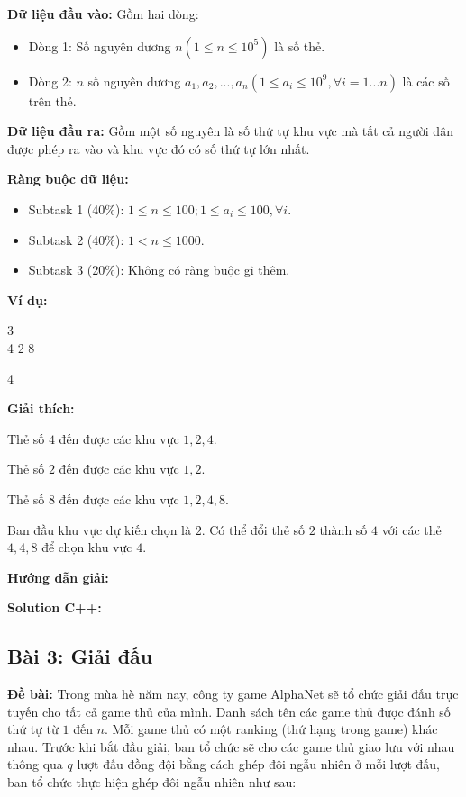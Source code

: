 \documentclass[12pt]{scrartcl}  %
\begin{document}
\textbf{Dữ liệu đầu vào:}
Gồm hai dòng:
\begin{itemize}
    \item Dòng 1: Số nguyên dương $n (1 \leq n \leq 10^5)$ là số thẻ.
    \item Dòng 2: $n$ số nguyên dương $a_1, a_2, ..., a_n (1 \leq a_i \leq 10^9, \forall i = 1 ... n)$ là các số trên thẻ.
\end{itemize}

\textbf{Dữ liệu đầu ra:}
Gồm một số nguyên là số thứ tự khu vực mà tất cả người dân được phép ra vào và khu vực đó có số thứ tự lớn nhất.

\textbf{Ràng buộc dữ liệu:}
\begin{itemize}
    \item Subtask 1 (40\%): $1 \leq n \leq 100; 1 \leq a_i \leq 100, \forall i$.
    \item Subtask 2 (40\%): $1 < n \leq 1000$.
    \item Subtask 3 (20\%): Không có ràng buộc gì thêm.
\end{itemize}

\textbf{Ví dụ:}
\begin{tcolorbox}[colback=gray!5!white, colframe=blue!50!black, title=Input]
3\\
4 2 8
\end{tcolorbox}

\begin{tcolorbox}[colback=gray!5!white, colframe=green!50!black, title=Output]
4
\end{tcolorbox}

\textbf{Giải thích:}

Thẻ số $4$ đến được các khu vực $1, 2, 4$.

Thẻ số $2$ đến được các khu vực $1, 2$.

Thẻ số $8$ đến được các khu vực $1, 2, 4, 8$.

Ban đầu khu vực dự kiến chọn là $2$. Có thể đổi thẻ số $2$ thành số $4$ với các thẻ $4, 4, 8$ để chọn khu vực $4$.

\textbf{Hướng dẫn giải:}

\textbf{Solution C++:}

\subsection{Bài 3: Giải đấu}
\textbf{Đề bài:}
Trong mùa hè năm nay, công ty game AlphaNet sẽ tổ chức giải đấu trực tuyến cho tất cả game thủ của mình. Danh sách tên các game thủ được đánh số thứ tự từ $1$ đến $n$. 
Mỗi game thủ có một ranking (thứ hạng trong game) khác nhau. Trước khi bắt đầu giải, ban tổ chức sẽ cho các game thủ giao lưu với nhau thông qua $q$ lượt đấu đồng đội bằng cách ghép đôi ngẫu nhiên ở mỗi lượt đấu, ban tổ chức thực hiện ghép đôi ngẫu nhiên như sau:
\end{document}
